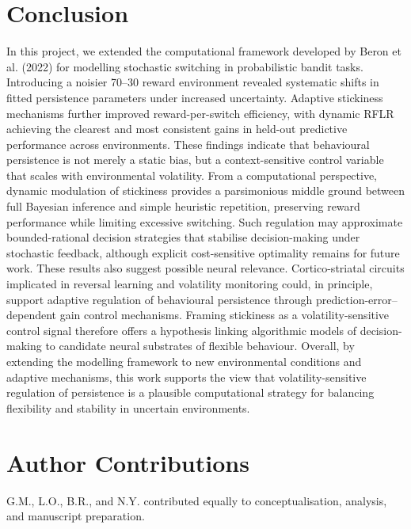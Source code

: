 \documentclass[11pt, reprint, aps, prl]{revtex4-2}
\begin{document}
\section{Conclusion}
In this project, we extended the computational framework developed by Beron et al. (2022) for modelling stochastic switching in probabilistic bandit tasks. Introducing a noisier 70--30 reward environment revealed systematic shifts in fitted persistence parameters under increased uncertainty. Adaptive stickiness mechanisms further improved reward-per-switch efficiency, with dynamic RFLR achieving the clearest and most consistent gains in held-out predictive performance across environments. These findings indicate that behavioural persistence is not merely a static bias, but a context-sensitive control variable that scales with environmental volatility.
From a computational perspective, dynamic modulation of stickiness provides a parsimonious middle ground between full Bayesian inference and simple heuristic repetition, preserving reward performance while limiting excessive switching. Such regulation may approximate bounded-rational decision strategies that stabilise decision-making under stochastic feedback, although explicit cost-sensitive optimality remains for future work.
These results also suggest possible neural relevance. Cortico-striatal circuits implicated in reversal learning and volatility monitoring could, in principle, support adaptive regulation of behavioural persistence through prediction-error--dependent gain control mechanisms. Framing stickiness as a volatility-sensitive control signal therefore offers a hypothesis linking algorithmic models of decision-making to candidate neural substrates of flexible behaviour.
Overall, by extending the modelling framework to new environmental conditions and adaptive mechanisms, this work supports the view that volatility-sensitive regulation of persistence is a plausible computational strategy for balancing flexibility and stability in uncertain environments.

\vspace{0.5\baselineskip}
\section{Author Contributions}
G.M., L.O., B.R., and N.Y. contributed equally to conceptualisation, analysis, and manuscript preparation.
\end{document}

